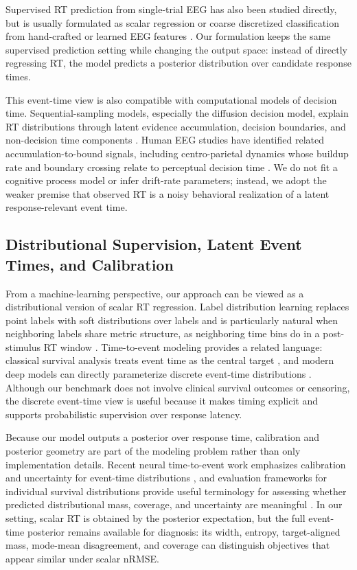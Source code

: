 \documentclass[12pt]{article}
\begin{document}
Supervised RT prediction from single-trial EEG has also been studied directly, but is
usually formulated as scalar regression or coarse discretized classification from
hand-crafted or learned EEG features \citep{Chowdhury2020RTSensors}. Our formulation
keeps the same supervised prediction setting while changing the output space: instead of
directly regressing RT, the model predicts a posterior distribution over candidate
response times.

This event-time view is also compatible with computational models of decision time.
Sequential-sampling models, especially the diffusion decision model, explain RT
distributions through latent evidence accumulation, decision boundaries, and
non-decision time components \citep{Ratcliff2008Diffusion}. Human EEG studies have
identified related accumulation-to-bound signals, including centro-parietal dynamics
whose buildup rate and boundary crossing relate to perceptual decision time
\citep{OConnell2012Supramodal,Kelly2013Internal}. We do not fit a cognitive process
model or infer drift-rate parameters; instead, we adopt the weaker premise that observed
RT is a noisy behavioral realization of a latent response-relevant event time.

\subsection{Distributional Supervision, Latent Event Times, and Calibration}
From a machine-learning perspective, our approach can be viewed as a distributional
version of scalar RT regression. Label distribution learning replaces point labels with
soft distributions over labels and is particularly natural when neighboring labels share
metric structure, as neighboring time bins do in a post-stimulus RT window
\citep{Geng2016LabelDistributionLearning}. Time-to-event modeling provides a related
language: classical survival analysis treats event time as the central target
\citep{Cox1972CoxPH}, and modern deep models can directly parameterize discrete
event-time distributions \citep{Lee2018DeepHit}. Although our benchmark does not
involve clinical survival outcomes or censoring, the discrete event-time view is useful
because it makes timing explicit and supports probabilistic supervision over response
latency.

Because our model outputs a posterior over response time, calibration and posterior
geometry are part of the modeling problem rather than only implementation details.
Recent neural time-to-event work emphasizes calibration and uncertainty for
event-time distributions \citep{Chapfuwa2023Calibration}, and evaluation frameworks
for individual survival distributions provide useful terminology for assessing whether
predicted distributional mass, coverage, and uncertainty are meaningful
\citep{Haider2020SurvivalDistributions}. In our setting, scalar RT is obtained by the
posterior expectation, but the full event-time posterior remains available for diagnosis:
its width, entropy, target-aligned mass, mode-mean disagreement, and coverage can
distinguish objectives that appear similar under scalar nRMSE.
\end{document}

